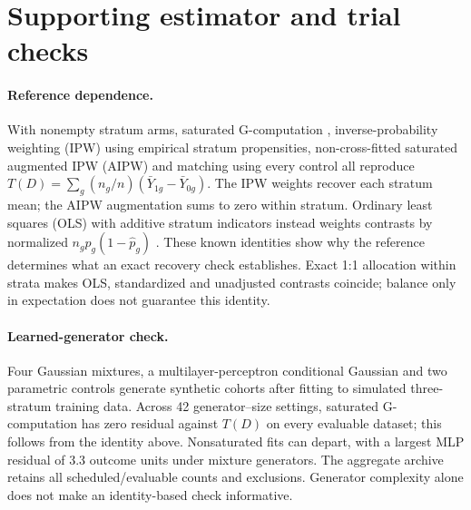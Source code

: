 \section{Supporting estimator and trial checks}
\label{app:matrix}\label{sec:matrix}

\paragraph{Reference dependence.}
With nonempty stratum arms, saturated G-computation \citep{robins1986}, inverse-probability weighting
(IPW) using empirical stratum propensities, non-cross-fitted saturated
augmented IPW (AIPW) and
matching using every control all reproduce
$T(D)=\sum_g(n_g/n)(\bar Y_{1g}-\bar Y_{0g})$. The IPW weights recover each
stratum mean; the AIPW augmentation sums to zero within stratum. Ordinary least squares (OLS) with
additive stratum indicators instead weights contrasts by normalized
$n_g\hat p_g(1-\hat p_g)$ \citep{angrist1998,frisch1933}. These known identities
show why the reference determines what an exact recovery check establishes.
Exact 1:1 allocation within strata makes OLS, standardized and unadjusted
contrasts coincide; balance only in expectation does not guarantee this identity.

\paragraph{Learned-generator check.}\label{app:learned}
Four Gaussian mixtures, a multilayer-perceptron conditional Gaussian and two
parametric controls generate synthetic cohorts after fitting to simulated
three-stratum training data. Across 42 generator--size settings, saturated
G-computation has zero residual against $T(D)$ on every evaluable dataset;
this follows from the identity above. Nonsaturated fits can depart, with a
largest MLP residual of 3.3 outcome units under mixture generators.
The aggregate archive retains all scheduled/evaluable counts and exclusions.
Generator complexity alone does not make an identity-based check informative.
